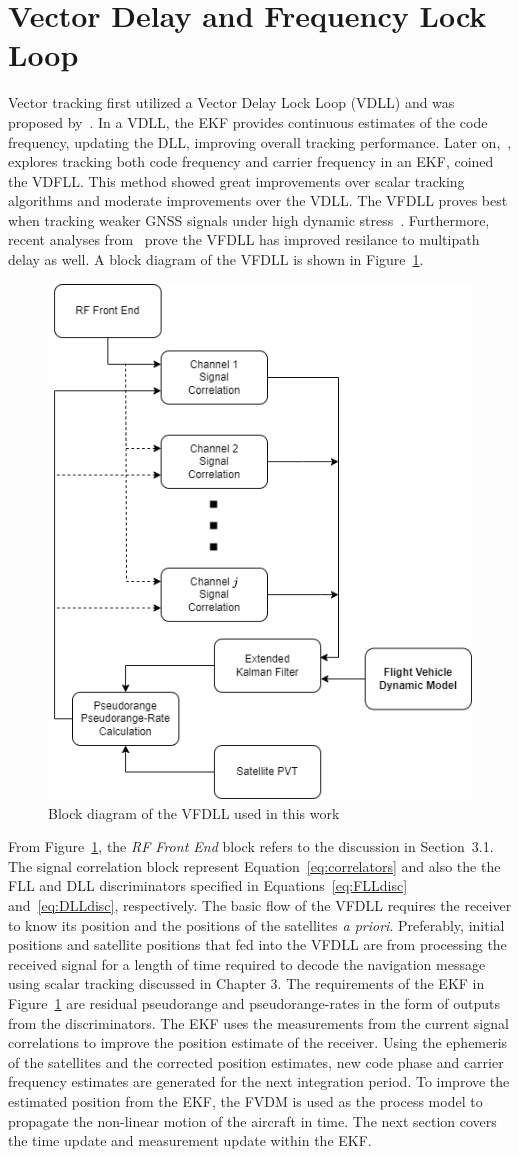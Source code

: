 \section{Vector Delay and Frequency Lock Loop}
Vector tracking first utilized a Vector Delay Lock Loop (VDLL) and was proposed by~\cite{}. In a VDLL, the EKF provides continuous estimates of the code frequency, updating the DLL, improving overall tracking performance. Later on,~\cite{}, explores tracking both code frequency and carrier frequency in an EKF, coined the VDFLL. This method showed great improvements over scalar tracking algorithms and moderate improvements over the VDLL. The VFDLL proves best when tracking weaker GNSS signals under high dynamic stress~\cite{}. Furthermore, recent analyses from~\cite{} prove the VFDLL has improved resilance to multipath delay as well. A block diagram of the VFDLL is shown in Figure~\ref{fig:VFDLL}.

\begin{figure}[!ht]
    \centering
    \includegraphics[width=0.45\linewidth]{Figures/VectorTracking.drawio.png}
    \caption{Block diagram of the VFDLL used in this work}\label{fig:VFDLL}
\end{figure}

From Figure~\ref{fig:VFDLL}, the \textit{RF Front End} block refers to the discussion in Section~3.1. The signal correlation block represent Equation~\ref{eq:correlators} and also the the FLL and DLL discriminators specified in Equations~\ref{eq:FLLdisc} and~\ref{eq:DLLdisc}, respectively. The basic flow of the VFDLL requires the receiver to know its position and the positions of the satellites \textit{a priori}. Preferably, initial positions and satellite positions that fed into the VFDLL are from processing the received signal for a length of time required to decode the navigation message using scalar tracking discussed in Chapter 3. The requirements of the EKF in Figure~\ref{fig:VFDLL} are residual pseudorange and pseudorange-rates in the form of outputs from the discriminators. The EKF uses the measurements from the current signal correlations to improve the position estimate of the receiver. Using the ephemeris of the satellites and the corrected position estimates, new code phase and carrier frequency estimates are generated for the next integration period. To improve the estimated position from the EKF, the FVDM is used as the process model to propagate the non-linear motion of the aircraft in time. The next section covers the time update and measurement update within the EKF\@.

